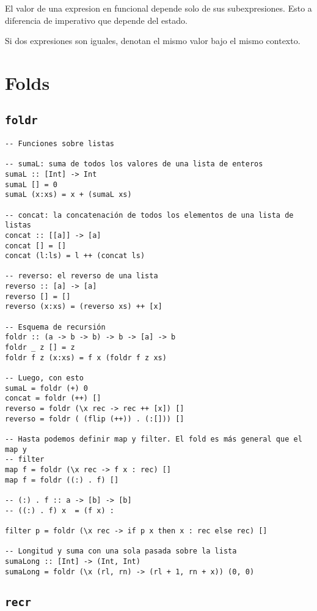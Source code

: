 \documentclass{report}
\theoremstyle{definition} %
\begin{document}
El valor de una expresion en funcional depende solo de sus subexpresiones. Esto
a diferencia de imperativo que depende del estado.

Si dos expresiones son iguales, denotan el mismo valor bajo el mismo contexto.

\section{Folds}

\subsection{\texttt{foldr}}

\begin{verbatim}
-- Funciones sobre listas

-- sumaL: suma de todos los valores de una lista de enteros
sumaL :: [Int] -> Int
sumaL [] = 0
sumaL (x:xs) = x + (sumaL xs)

-- concat: la concatenación de todos los elementos de una lista de listas
concat :: [[a]] -> [a]
concat [] = []
concat (l:ls) = l ++ (concat ls)

-- reverso: el reverso de una lista
reverso :: [a] -> [a]
reverso [] = []
reverso (x:xs) = (reverso xs) ++ [x]

-- Esquema de recursión
foldr :: (a -> b -> b) -> b -> [a] -> b
foldr _ z [] = z
foldr f z (x:xs) = f x (foldr f z xs)

-- Luego, con esto
sumaL = foldr (+) 0
concat = foldr (++) []
reverso = foldr (\x rec -> rec ++ [x]) []
reverso = foldr ( (flip (++)) . (:[])) []

-- Hasta podemos definir map y filter. El fold es más general que el map y
-- filter
map f = foldr (\x rec -> f x : rec) []
map f = foldr ((:) . f) []

-- (:) . f :: a -> [b] -> [b]
-- ((:) . f) x  = (f x) :

filter p = foldr (\x rec -> if p x then x : rec else rec) []

-- Longitud y suma con una sola pasada sobre la lista
sumaLong :: [Int] -> (Int, Int)
sumaLong = foldr (\x (rl, rn) -> (rl + 1, rn + x)) (0, 0)
\end{verbatim}

\subsection{\texttt{recr}}
\end{document}
